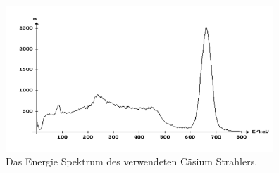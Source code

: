  \begin{figure}
   \centering
   \includegraphics[height=5.5cm]{content/pictures/Spektrum.png}
   \caption{Das Energie Spektrum des verwendeten Cäsium Strahlers.\cite{spektrum}}
   \label{fig:spektrum}
 \end{figure}